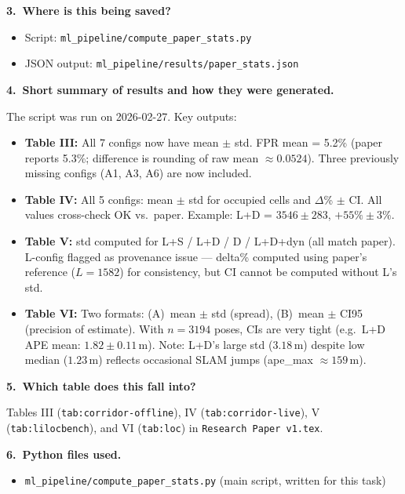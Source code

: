 \documentclass[11pt,a4paper]{article}
\begin{document}
\textbf{3.\ Where is this being saved?}

\begin{itemize}[nosep]
  \item Script: \texttt{ml\_pipeline/compute\_paper\_stats.py}
  \item JSON output: \texttt{ml\_pipeline/results/paper\_stats.json}
\end{itemize}

\textbf{4.\ Short summary of results and how they were generated.}

The script was run on 2026-02-27. Key outputs:

\begin{itemize}[nosep]
  \item \textbf{Table III:} All 7 configs now have mean $\pm$ std.
    FPR mean = 5.2\% (paper reports 5.3\%; difference is rounding of
    raw mean $\approx 0.0524$). Three previously missing configs
    (A1, A3, A6) are now included.
  \item \textbf{Table IV:} All 5 configs: mean $\pm$ std for occupied
    cells and $\Delta$\% $\pm$ CI. All values cross-check OK vs.\ paper.
    Example: L+D = $3546 \pm 283$, $+55\% \pm 3\%$.
  \item \textbf{Table V:} std computed for L+S / L+D / D / L+D+dyn
    (all match paper). L-config flagged as provenance issue ---
    delta\% computed using paper's reference ($L = 1582$) for
    consistency, but CI cannot be computed without L's std.
  \item \textbf{Table VI:} Two formats: (A)~mean $\pm$ std (spread),
    (B)~mean $\pm$ CI95 (precision of estimate). With $n = 3194$ poses,
    CIs are very tight (e.g.\ L+D APE mean: $1.82 \pm 0.11$\,m).
    Note: L+D's large std ($3.18$\,m) despite low median ($1.23$\,m)
    reflects occasional SLAM jumps (ape\_max $\approx 159$\,m).
\end{itemize}

\textbf{5.\ Which table does this fall into?}

Tables III (\texttt{tab:corridor-offline}), IV (\texttt{tab:corridor-live}),
V (\texttt{tab:lilocbench}), and VI (\texttt{tab:loc}) in
\texttt{Research Paper v1.tex}.

\textbf{6.\ Python files used.}

\begin{itemize}[nosep]
  \item \texttt{ml\_pipeline/compute\_paper\_stats.py} (main script, written
    for this task)
\end{itemize}
\end{document}
